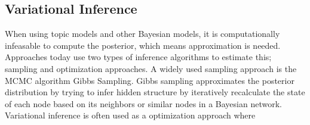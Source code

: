 \subsection{Variational Inference}
When using topic models and other Bayesian models, it is computationally infeasable to compute the posterior, which means approximation is needed. 
Approaches today use two types of inference algorithms to estimate this; sampling and optimization approaches.
A widely used sampling approach is the MCMC algorithm Gibbs Sampling.
Gibbs sampling approximates the posterior distribution by trying to infer hidden structure by iteratively recalculate the state of each node based on its neighbors or similar nodes in a Bayesian network.
Variational inference is often used as a optimization approach where
  